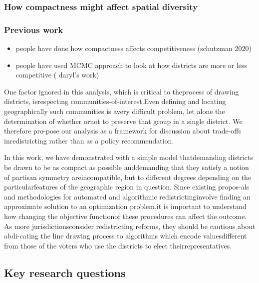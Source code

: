 \documentclass[]{article}
\providecommand{\tightlist}{%
  \setlength{\itemsep}{0pt}\setlength{\parskip}{0pt}}
\begin{document}
\cite{steph2012}

\hypertarget{how-compactness-might-affect-spatial-diversity}{%
\subsubsection{How compactness might affect spatial
diversity}\label{how-compactness-might-affect-spatial-diversity}}

\hypertarget{previous-work}{%
\subsubsection{Previous work}\label{previous-work}}

\begin{itemize}
\tightlist
\item
  people have done how compactness affects competitiveness (schutzman
  2020)
\item
  people have used MCMC approach to look at how districts are more or
  less competitive ( daryl's work)
\end{itemize}

One factor ignored in this analysis, which is critical to theprocess of
drawing districts, isrespecting communities-of-interest.Even defining
and locating geographically such communities is avery difficult problem,
let alone the determination of whether ornot to preserve that group in a
single district. We therefore pro-pose our analysis as a framework for
discussion about trade-offs inredistricting rather than as a policy
recommendation.

In this work, we have demonstrated with a simple model thatdemanding
districts be drawn to be as compact as possible anddemanding that they
satisfy a notion of partisan symmetry areincompatible, but to different
degrees depending on the particularfeatures of the geographic region in
question. Since existing propos-als and methodologies for automated and
algorithmic redistrictinginvolve finding an approximate solution to an
optimization problem,it is important to understand how changing the
objective functionof these procedures can affect the outcome. As more
jurisdictionsconsider redistricting reforms, they should be cautious
about abdi-cating the line drawing process to algorithms which encode
valuesdifferent from those of the voters who use the districts to elect
theirrepresentatives.

\hypertarget{key-research-questions}{%
\subsection{Key research questions}\label{key-research-questions}}
\end{document}
